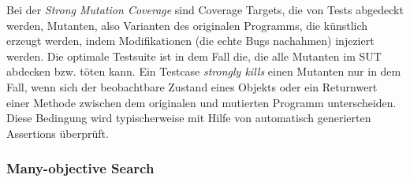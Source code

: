 \documentclass{article}
\begin{document}
Bei der \textit{Strong Mutation Coverage} sind Coverage Targets, die von Tests abgedeckt werden, Mutanten, also Varianten des originalen Programms, die künstlich erzeugt werden, indem Modifikationen (die echte Bugs nachahmen) injeziert werden. Die optimale Testsuite ist in dem Fall die, die alle Mutanten im \ac{SUT} abdecken bzw. töten kann. Ein Testcase \textit{strongly kills} einen Mutanten nur in dem Fall, wenn sich der beobachtbare Zustand eines Objekts oder ein Returnwert einer Methode zwischen dem originalen und mutierten Programm unterscheiden. Diese Bedingung wird typischerweise mit Hilfe von automatisch generierten Assertions überprüft. 


\subsubsection{Many-objective Search}
\end{document}
